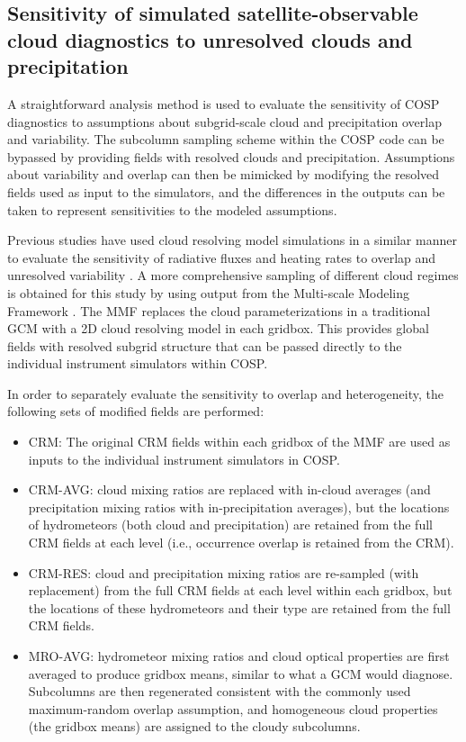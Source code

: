 \documentclass[letter]{article}
\begin{document}
\subsection{Sensitivity of simulated satellite-observable cloud diagnostics to unresolved clouds and precipitation}
\label{cosp_sensitivity}
A straightforward analysis method is used to evaluate the sensitivity of COSP diagnostics to assumptions about subgrid-scale cloud and precipitation overlap and variability. The subcolumn sampling scheme within the COSP code can be bypassed by providing fields with resolved clouds and precipitation. Assumptions about variability and overlap can then be mimicked by modifying the resolved fields used as input to the simulators, and the differences in the outputs can be taken to represent sensitivities to the modeled assumptions.

Previous studies have used cloud resolving model simulations in a similar manner to evaluate the sensitivity of radiative fluxes and heating rates to overlap and unresolved variability \citep[e.g.,][]{barker_et_al_1999,wu_and_liang_2005}. A more comprehensive sampling of different cloud regimes is obtained for this study by using output from the Multi-scale Modeling Framework \citep[MMF;][]{khairoutdinov_and_randall_2001,randall_et_al_2003}. The MMF replaces the cloud parameterizations in a traditional GCM with a 2D cloud resolving model in each gridbox. This provides global fields with resolved subgrid structure that can be passed directly to the individual instrument simulators within COSP.

In order to separately evaluate the sensitivity to overlap and heterogeneity, the following sets of modified fields are performed:
\begin{itemize}
    \item CRM: The original CRM fields within each gridbox of the MMF are used as inputs to the individual instrument simulators in COSP.
    \item CRM-AVG: cloud mixing ratios are replaced with in-cloud averages (and precipitation mixing ratios with in-precipitation averages), but the locations of hydrometeors (both cloud and precipitation) are retained from the full CRM fields at each level (i.e., occurrence overlap is retained from the CRM).
    \item CRM-RES: cloud and precipitation mixing ratios are re-sampled (with replacement) from the full CRM fields at each level within each gridbox, but the locations of these hydrometeors and their type are retained from the full CRM fields.
    \item MRO-AVG: hydrometeor mixing ratios and cloud optical properties are first averaged to produce gridbox means, similar to what a GCM would diagnose. Subcolumns are then regenerated consistent with the commonly used maximum-random overlap assumption, and homogeneous cloud properties (the gridbox means) are assigned to the cloudy subcolumns.
\end{itemize}
\end{document}
